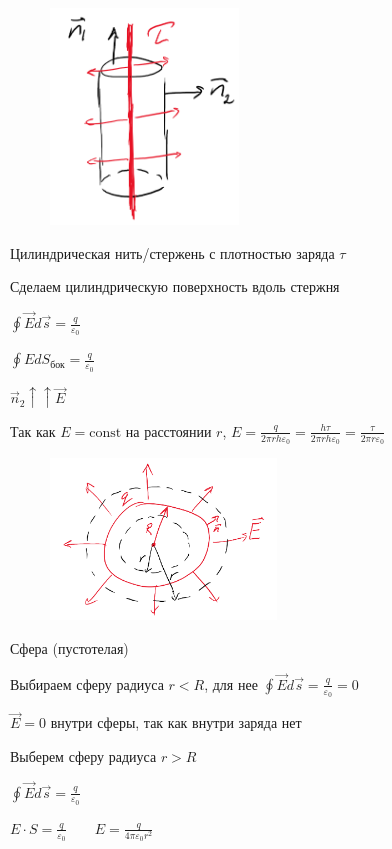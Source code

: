 \documentclass[12pt]{article}
\begin{document}
    \begin{minipage}{\textwidth}
        \begin{figure}
            \includegraphics[width=5cm]{physics1/images/physics1_2024_11_18_3}
        \end{figure}

         Цилиндрическая нить/стержень с плотностью заряда $\tau$

        Сделаем цилиндрическую поверхность вдоль стержня

        $\oint \vec{E} d\vec{s} = \frac{q}{\varepsilon_0}$

        $\oint E dS_{\text{бок}} = \frac{q}{\varepsilon_0}$

        $\vec{n}_2 \uparrow\uparrow \vec{E}$ 

        Так как $E = \mathrm{const}$ на расстоянии $r$, $E = \frac{q}{2\pi r h \varepsilon_0} = \frac{h\tau}{2\pi r h \varepsilon_0} = \frac{\tau}{2\pi r \varepsilon_0}$
    \end{minipage}


    \begin{minipage}{\textwidth}
        \begin{figure}
            \includegraphics[width=6cm]{physics1/images/physics1_2024_11_18_4}
        \end{figure}

         Сфера (пустотелая)

        Выбираем сферу радиуса $r < R$, для нее $\oint \vec{E} d\vec{s} = \frac{q}{\varepsilon_0} = 0$

        $\vec{E} = 0$ внутри сферы, так как внутри заряда нет

        Выберем сферу радиуса $r > R$

        $\oint \vec{E} d\vec{s} = \frac{q}{\varepsilon_0}$

        $E \cdot S = \frac{q}{\varepsilon_0} \qquad E = \frac{q}{4\pi \varepsilon_0 r^2}$    
    \end{minipage}
\end{document}
